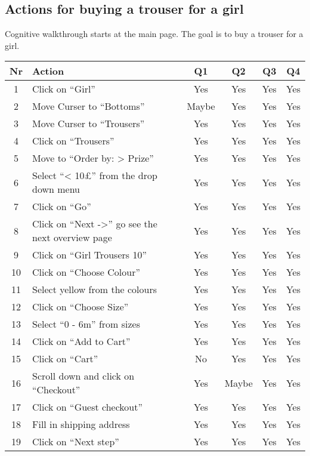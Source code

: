 \documentclass[fontsize=12pt,paper=a4]{scrartcl}
\begin{document}
\subsection{Actions for buying a trouser for a girl}
Cognitive walkthrough starts at the main page. The goal is to buy a trouser for a girl.  
\begin{table}[htdp]
\begin{center}
\begin{tabular}{|c|l|c|c|c|c|}
\hline
\textbf{Nr} & \textbf{Action} & \textbf{Q1} & \textbf{Q2} & \textbf{Q3} &\textbf{Q4} \\
\hline
1 & Click on ``Girl''& Yes & Yes & Yes & Yes\\
\hline
2 & Move Curser to ``Bottoms'' & Maybe & Yes & Yes & Yes \\
\hline
3 & Move Curser to ``Trousers'' & Yes & Yes & Yes & Yes \\
\hline
4 & Click on ``Trousers'' & Yes & Yes & Yes & Yes \\
\hline
5 & Move to ``Order by: > Prize'' & Yes & Yes & Yes & Yes \\
\hline
6 & Select ``< 10\pounds'' from the drop down menu & Yes & Yes & Yes & Yes\\
\hline
7 & Click on ``Go'' & Yes & Yes & Yes & Yes\\
\hline
8 & Click on ``Next ->'' go see the next overview page & Yes & Yes & Yes & Yes\\
\hline
9 & Click on ``Girl Trousers 10'' & Yes & Yes & Yes & Yes\\
\hline
10 & Click on ``Choose Colour'' & Yes & Yes & Yes & Yes\\
\hline
11 & Select yellow from the colours & Yes & Yes & Yes & Yes\\
\hline
12 & Click on ``Choose Size'' & Yes & Yes & Yes & Yes\\
\hline
13 & Select ``0 - 6m'' from sizes & Yes & Yes & Yes & Yes\\
\hline
14 & Click on ``Add to Cart'' & Yes & Yes & Yes & Yes\\
\hline
15 & Click on ``Cart'' & No & Yes & Yes & Yes\\
\hline
16 & Scroll down and click on ``Checkout'' & Yes & Maybe & Yes & Yes\\
\hline
17 & Click on ``Guest checkout'' & Yes & Yes & Yes & Yes\\
\hline
18 & Fill in shipping address & Yes & Yes & Yes & Yes\\
\hline
19 & Click on ``Next step'' & Yes & Yes & Yes & Yes\\

\end{tabular}
\end{center}
\end{table}
\end{document}

